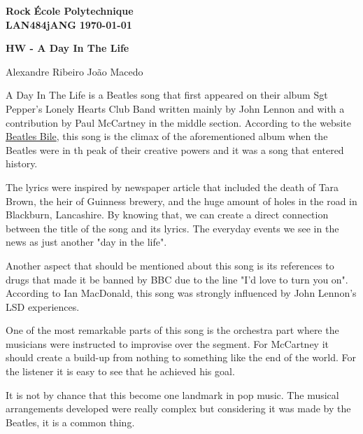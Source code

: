 \documentclass[12pt]{article} %
\newcommand{\createHeader}[5]{
	\noindent
	\normalsize\textbf{#2} \hfill \textbf{#1}\\
	\normalsize\textbf{#3} \hfill \textbf{\today}\vspace{10pt}
	\centerline{\Large \textbf{#5}}\vspace{1pt}
	\centerline{\small #4}\vspace{20pt}}
\begin{document}
	\createHeader{École Polytechnique}{Rock}{LAN484jANG}{Alexandre Ribeiro João Macedo}{HW - A Day In The Life}
	
\begin{linenumbers}
A Day In The Life is a Beatles song that first appeared on their album Sgt Pepper's Lonely Hearts Club Band written mainly by John Lennon and with a contribution by Paul McCartney in the middle section. According to the website \href{https://www.beatlesbible.com/songs/a-day-in-the-life/}{Beatles Bile}, this song is the climax of the aforementioned album when the Beatles were in th peak of their creative powers and it was a song that entered history.

The lyrics were inspired by newspaper article that included the death of Tara Brown, the heir of Guinness brewery, and the huge amount of holes in the road in Blackburn, Lancashire. By knowing that, we can create a direct connection between the title of the song and its lyrics. The everyday events we see in the news as just another "day in the life".

Another aspect that should be mentioned about this song is its references to drugs that made it be banned by BBC due to the line "I'd love to turn you on". According to Ian MacDonald, this song was strongly influenced by John Lennon's LSD experiences.

One of the most remarkable parts of this song is the orchestra part where the musicians were instructed to improvise over the segment. For McCartney it should create a build-up from nothing to something like the end of the world. For the listener it is easy to see that he achieved his goal.

It is not by chance that this become one landmark in pop music. The musical arrangements developed were really complex but considering it was made by the Beatles, it is a common thing. 
\end{linenumbers}
\end{document}
